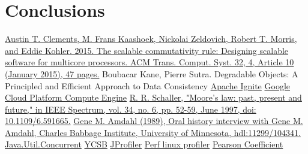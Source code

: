 \documentclass[conference]{IEEEtran}
\begin{document}
\bigbreak
\section{Conclusions}



\bigbreak

\begin{thebibliography}{00}
 \href{https://dl.acm.org/doi/10.1145/2699681}{Austin T. Clements, M. Frans Kaashoek, Nickolai Zeldovich, Robert T. Morris, and Eddie Kohler. 2015. The scalable commutativity rule: Designing scalable software for multicore processors. ACM Trans. Comput. Syst. 32, 4, Article 10 (January 2015), 47 pages.}
 Boubacar Kane, Pierre Sutra. Degradable Objects: A Principled and Efficient Approach to Data Consistency
 \href{https://ignite.apache.org/docs/latest/}{Apache Ignite}
 \href{https://cloud.google.com/compute/docs}{Google Cloud Platform Compute Engine}
 \href{https://ieeexplore.ieee.org/document/591665}{R. R. Schaller, "Moore's law: past, present and future," in IEEE Spectrum, vol. 34, no. 6, pp. 52-59, June 1997, doi: 10.1109/6.591665.}
 \href{https://conservancy.umn.edu/handle/11299/104341}{Gene M. Amdahl (1989), Oral history interview with Gene M. Amdahl, Charles Babbage Institute, University of Minnesota, hdl:11299/104341.}
 \href{https://docs.oracle.com/javase/8/docs/api/index.html?java/util/concurrent/package-summary.html}{Java.Util.Concurrent}
 \href{https://ycsb.site}{YCSB}
 \href{https://www.ej-technologies.com/products/jprofiler/overview.html}{JProfiler}
 \href{https://perf.wiki.kernel.org/index.php/Main_Page}{Perf linux profiler}
 \href{https://libguides.library.kent.edu/SPSS/PearsonCorr}{Pearson Coefficient}
\end{thebibliography}

\vspace{12pt}
\end{document}
